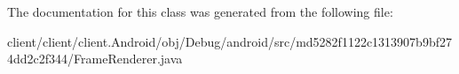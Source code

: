 The documentation for this class was generated from the following file\+:\begin{DoxyCompactItemize}
\item 
client/client/client.\+Android/obj/\+Debug/android/src/md5282f1122c1313907b9bf274dd2c2f344/Frame\+Renderer.\+java\end{DoxyCompactItemize}
